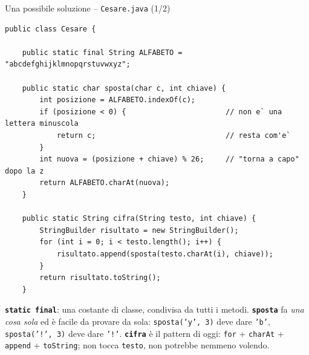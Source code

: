 \documentclass[10pt,aspectratio=169]{beamer}
\begin{document}
\begin{frame}[fragile]{Una possibile soluzione -- \texttt{Cesare.java} (1/2)}
\begin{lstlisting}[basicstyle=\ttfamily\scriptsize]
public class Cesare {

    public static final String ALFABETO = "abcdefghijklmnopqrstuvwxyz";

    public static char sposta(char c, int chiave) {
        int posizione = ALFABETO.indexOf(c);
        if (posizione < 0) {                       // non e` una lettera minuscola
            return c;                              // resta com'e`
        }
        int nuova = (posizione + chiave) % 26;     // "torna a capo" dopo la z
        return ALFABETO.charAt(nuova);
    }

    public static String cifra(String testo, int chiave) {
        StringBuilder risultato = new StringBuilder();
        for (int i = 0; i < testo.length(); i++) {
            risultato.append(sposta(testo.charAt(i), chiave));
        }
        return risultato.toString();
    }
\end{lstlisting}
\footnotesize \textbf{\texttt{static final}}: una costante di classe, condivisa da tutti i metodi. \textbf{\texttt{sposta}} fa \emph{una cosa sola} ed è facile da provare da sola: \texttt{sposta('y', 3)} deve dare \texttt{'b'}, \texttt{sposta('!', 3)} deve dare \texttt{'!'}. \textbf{\texttt{cifra}} è il pattern di oggi: \texttt{for} + \texttt{charAt} + \texttt{append} + \texttt{toString}; non tocca \texttt{testo}, non potrebbe nemmeno volendo.
\end{frame}
\end{document}
